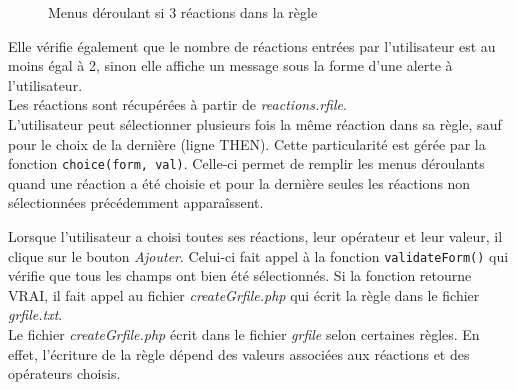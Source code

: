 \begin{figure}[!ht]
	\begin{center}
		\caption{Menus déroulant si 3 réactions dans la règle}
  		\label{menusDeroulants2}
  	\end{center}	
\end{figure}

Elle vérifie également que le nombre de réactions entrées par l'utilisateur est au moins égal à 2, sinon elle affiche un message sous la forme d'une alerte à l'utilisateur.\\
Les réactions sont récupérées à partir de \emph{reactions.rfile}.\\

L'utilisateur peut sélectionner plusieurs fois la m\^eme réaction dans sa règle, sauf pour le choix de la dernière (ligne THEN). Cette particularité est gérée par la fonction \texttt{choice(form, val)}. Celle-ci permet de remplir les menus déroulants quand une réaction a été choisie et pour la dernière seules les réactions non sélectionnées précédemment appara\^issent.

Lorsque l'utilisateur a choisi toutes ses réactions, leur opérateur et leur valeur, il clique sur le bouton \emph{Ajouter}. Celui-ci fait appel à la fonction \texttt{validateForm()} qui vérifie que tous les champs ont bien été sélectionnés. Si la fonction retourne VRAI, il fait appel au fichier \emph{createGrfile.php} qui écrit la règle dans le fichier \emph{grfile.txt}.\\
Le fichier \emph{createGrfile.php} écrit dans le fichier \emph{grfile} selon certaines règles. En effet, l'écriture de la règle dépend des valeurs associées aux réactions et des opérateurs choisis.\\

